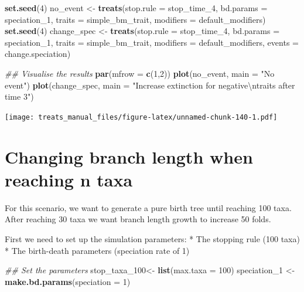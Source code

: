 \documentclass[
]{book}
\newenvironment{Shaded}{\begin{snugshade}}{\end{snugshade}}
\newcommand{\CharTok}[1]{\textcolor[rgb]{0.31,0.60,0.02}{#1}}
\newcommand{\CommentTok}[1]{\textcolor[rgb]{0.56,0.35,0.01}{\textit{#1}}}
\newcommand{\DataTypeTok}[1]{\textcolor[rgb]{0.13,0.29,0.53}{#1}}
\newcommand{\DecValTok}[1]{\textcolor[rgb]{0.00,0.00,0.81}{#1}}
\newcommand{\KeywordTok}[1]{\textcolor[rgb]{0.13,0.29,0.53}{\textbf{#1}}}
\newcommand{\NormalTok}[1]{#1}
\newcommand{\StringTok}[1]{\textcolor[rgb]{0.31,0.60,0.02}{#1}}
\begin{document}
\begin{Shaded}
\begin{Highlighting}[]
\KeywordTok{set.seed}\NormalTok{(}\DecValTok{4}\NormalTok{)}
\NormalTok{no\_event \textless{}{-}}\StringTok{ }\KeywordTok{treats}\NormalTok{(}\DataTypeTok{stop.rule =}\NormalTok{ stop\_time\_}\DecValTok{4}\NormalTok{,}
                 \DataTypeTok{bd.params =}\NormalTok{ speciation\_}\DecValTok{1}\NormalTok{,}
                 \DataTypeTok{traits    =}\NormalTok{ simple\_bm\_trait,}
                 \DataTypeTok{modifiers =}\NormalTok{ default\_modifiers)}
\KeywordTok{set.seed}\NormalTok{(}\DecValTok{4}\NormalTok{)}
\NormalTok{change\_spec \textless{}{-}}\StringTok{ }\KeywordTok{treats}\NormalTok{(}\DataTypeTok{stop.rule =}\NormalTok{ stop\_time\_}\DecValTok{4}\NormalTok{,}
                    \DataTypeTok{bd.params =}\NormalTok{ speciation\_}\DecValTok{1}\NormalTok{,}
                    \DataTypeTok{traits    =}\NormalTok{ simple\_bm\_trait,}
                    \DataTypeTok{modifiers =}\NormalTok{ default\_modifiers,}
                    \DataTypeTok{events    =}\NormalTok{ change.speciation)}

\CommentTok{\#\# Visualise the results}
\KeywordTok{par}\NormalTok{(}\DataTypeTok{mfrow =} \KeywordTok{c}\NormalTok{(}\DecValTok{1}\NormalTok{,}\DecValTok{2}\NormalTok{))}
\KeywordTok{plot}\NormalTok{(no\_event, }\DataTypeTok{main =} \StringTok{"No event"}\NormalTok{)}
\KeywordTok{plot}\NormalTok{(change\_spec, }\DataTypeTok{main =} \StringTok{"Increase extinction for negative}\CharTok{\textbackslash{}n}\StringTok{traits after time 3"}\NormalTok{)}
\end{Highlighting}
\end{Shaded}

\texttt{[image: treats\_manual\_files/figure-latex/unnamed-chunk-140-1.pdf]}

\hypertarget{EG_modify_brlen}{%
\section{Changing branch length when reaching n taxa}\label{EG_modify_brlen}}

For this scenario, we want to generate a pure birth tree until reaching 100 taxa.
After reaching 30 taxa we want branch length growth to increase 50 folds.

First we need to set up the simulation parameters:
* The stopping rule (100 taxa)
* The birth-death parameters (speciation rate of 1)

\begin{Shaded}
\begin{Highlighting}[]
\CommentTok{\#\# Set the parameters}
\NormalTok{stop\_taxa\_}\DecValTok{100}\NormalTok{\textless{}{-}}\StringTok{ }\KeywordTok{list}\NormalTok{(}\DataTypeTok{max.taxa =} \DecValTok{100}\NormalTok{)}
\NormalTok{speciation\_}\DecValTok{1}\NormalTok{ \textless{}{-}}\StringTok{ }\KeywordTok{make.bd.params}\NormalTok{(}\DataTypeTok{speciation =} \DecValTok{1}\NormalTok{)}
\end{Highlighting}
\end{Shaded}
\end{document}
